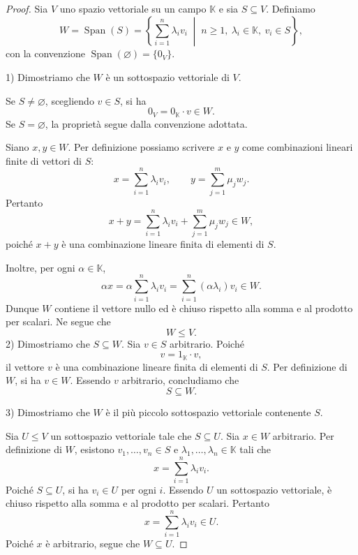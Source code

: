 \documentclass[11pt,a4paper]{article}
\theoremstyle{plain}
\theoremstyle{definition}
\theoremstyle{remark}
\begin{document}
\begin{proof}
    Sia \(V\) uno spazio vettoriale su un campo \(\mathbb{K}\) e sia \(S\subseteq V\). Definiamo
    \[
        W=\operatorname{Span}(S)
        =\left\{\sum_{i=1}^{n}\lambda_i v_i\;\middle|\;n\geq 1,\ \lambda_i\in\mathbb{K},\ v_i\in S
        \right\},
    \]
    con la convenzione \(\operatorname{Span}(\varnothing)=\{0_V\}\).

    1) Dimostriamo che \(W\) è un sottospazio vettoriale di \(V\).

    Se \(S\neq\varnothing\), scegliendo \(v\in S\), si ha
    \[
        0_V=0_{\mathbb{K}}\cdot v\in W.
    \]
    Se \(S=\varnothing\), la proprietà segue dalla convenzione adottata.

    Siano \(x,y\in W\). Per definizione possiamo scrivere
    \(x\) e \(y\) come combinazioni lineari finite di vettori di \(S\):
    \[
        x=\sum_{i=1}^{n}\lambda_i v_i,
        \qquad
        y=\sum_{j=1}^{m}\mu_j w_j.
    \]
    Pertanto
    \[
        x+y=
        \sum_{i=1}^{n}\lambda_i v_i+
        \sum_{j=1}^{m}\mu_j w_j\in W,
    \]
    poiché \(x+y\) è una combinazione lineare finita di elementi di \(S\).

    Inoltre, per ogni \(\alpha\in\mathbb{K}\),
    \[
        \alpha x
        =\alpha\sum_{i=1}^{n}\lambda_i v_i
        =\sum_{i=1}^{n}(\alpha\lambda_i)v_i\in W.
    \]
    Dunque \(W\) contiene il vettore nullo ed è chiuso rispetto alla somma e al prodotto per scalari. Ne segue che
    \[
        W\leq V.
    \]
    2) Dimostriamo che \(S\subseteq W\).
    Sia \(v\in S\) arbitrario. Poiché
    \[
        v=1_{\mathbb{K}}\cdot v,
    \]
    il vettore \(v\) è una combinazione lineare finita di elementi di \(S\). Per definizione di \(W\), si ha \(v\in W\). Essendo \(v\) arbitrario, concludiamo che
    \[
    S\subseteq W.
    \]

    3) Dimostriamo che \(W\) è il più piccolo sottospazio vettoriale contenente \(S\).

    Sia \(U\leq V\) un sottospazio vettoriale tale che \(S\subseteq U\). Sia \(x\in W\) arbitrario. Per definizione di \(W\), esistono \(v_1,\ldots,v_n\in S\) e \(\lambda_1,\ldots,\lambda_n\in\mathbb{K}\) tali che
    \[
        x=\sum_{i=1}^{n}\lambda_i v_i.
    \]
    Poiché \(S\subseteq U\), si ha \(v_i\in U\) per ogni \(i\). Essendo \(U\) un sottospazio vettoriale, è chiuso rispetto alla somma e al prodotto per scalari. Pertanto
    \[
    x=\sum_{i=1}^{n}\lambda_i v_i\in U.
    \]
    Poiché \(x\) è arbitrario, segue che \(W\subseteq U\).


\end{proof}
\end{document}
